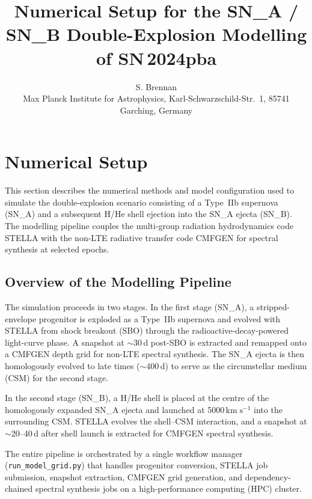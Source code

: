 \documentclass[11pt, a4paper]{article}
\newcommand{\kms}{\ensuremath{\mathrm{km\;s^{-1}}}}
\begin{document}
\title{Numerical Setup for the SN\_A / SN\_B Double-Explosion Modelling of SN\,2024pba}

\author{S. Brennan\\
\small Max Planck Institute for Astrophysics, Karl-Schwarzschild-Str.\ 1, 85741 Garching, Germany}

\section{Numerical Setup}
\label{sec:numerical_setup}

This section describes the numerical methods and model configuration used to
simulate the double-explosion scenario consisting of a Type~IIb supernova
(SN\_A) and a subsequent H/He shell ejection into the SN\_A ejecta (SN\_B).
The modelling pipeline couples the multi-group radiation hydrodynamics code
STELLA \citep{Blinnikov1998, Blinnikov2000, Blinnikov2006} with the non-LTE
radiative transfer code CMFGEN \citep{Hillier1998, HillierDessart2012,
Dessart2015} for spectral synthesis at selected epochs.

\subsection{Overview of the Modelling Pipeline}
\label{subsec:pipeline_overview}

The simulation proceeds in two stages.  In the first stage (SN\_A), a
stripped-envelope progenitor is exploded as a Type~IIb supernova and evolved
with STELLA from shock breakout (SBO) through the radioactive-decay-powered
light-curve phase.  A snapshot at $\sim$30\,d post-SBO is extracted and
remapped onto a CMFGEN depth grid for non-LTE spectral synthesis.  The SN\_A
ejecta is then homologously evolved to late times ($\sim$400\,d) to serve as
the circumstellar medium (CSM) for the second stage.

In the second stage (SN\_B), a H/He shell is placed at the centre of the
homologously expanded SN\_A ejecta and launched at 5000\,$\kms$ into the
surrounding CSM.  STELLA evolves the shell--CSM interaction, and a snapshot
at $\sim$20--40\,d after shell launch is extracted for CMFGEN spectral
synthesis.

The entire pipeline is orchestrated by a single workflow manager
(\texttt{run\_model\_grid.py}) that handles progenitor conversion, STELLA
job submission, snapshot extraction, CMFGEN grid generation, and
dependency-chained spectral synthesis jobs on a high-performance computing
(HPC) cluster.
\end{document}

